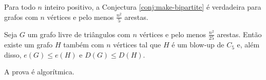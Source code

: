 \begin{theorem} \label{thm:n2/5}
  Para todo $n$ inteiro positivo, a Conjectura \ref{conj:make-bipartite}
  é verdadeira para grafos com $n$ vértices e pelo menos $\frac{n^2}{5}$ arestas.
\end{theorem}

\begin{theorem}
  Seja $G$ um grafo livre de triângulos com $n$ vértices e pelo menos $\frac{n^2}{25}$ arestas.
  Então existe um grafo $H$ também com $n$ vértices tal que $H$ é um blow-up de $C_5$ e, além disso,
  $e(G) \leq e(H)$ e $D(G) \leq D(H)$.
\end{theorem}

A prova é algorítmica.